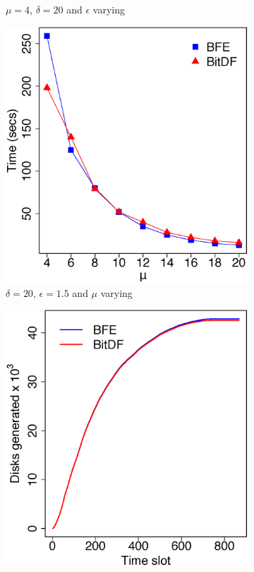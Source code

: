 \begin{figure}
\begin{subfigure}[t]{0.48\textwidth}
        \caption{$\mu = 4$, $\delta = 20$ and $\epsilon$ varying}
        \label{fig:trucks_vary_g}
    \end{subfigure}
    \begin{subfigure}[t]{0.48\textwidth}
        \includegraphics[width=\textwidth]{images/Trucks_l_20_g_1_5_varying_n.eps}
        \caption{$\delta = 20$, $\epsilon = 1.5$ and $\mu$ varying}
        \label{fig:trucks_vary_n}
    \end{subfigure}
    \begin{subfigure}[t]{0.48\textwidth}
        \includegraphics[width=\textwidth]{images/Trucks_d.eps}

\end{subfigure}
\end{figure}
